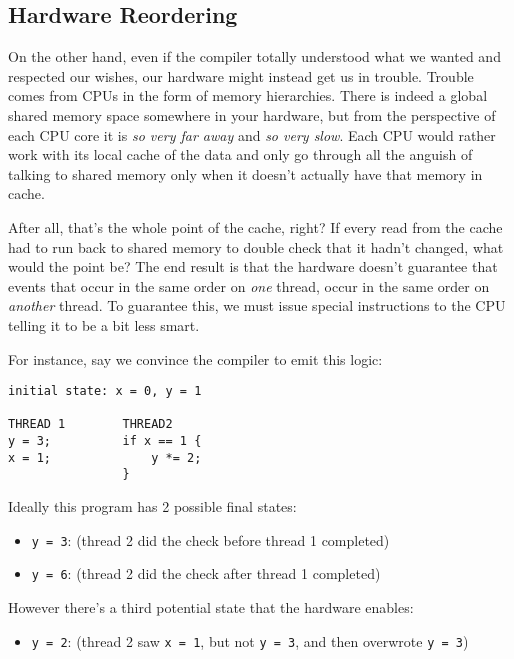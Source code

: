 \documentclass[a4paper,]{book}
\providecommand{\tightlist}{%
  \setlength{\itemsep}{0pt}\setlength{\parskip}{0pt}}
\begin{document}
\subsection{Hardware Reordering}\label{hardware-reordering}

On the other hand, even if the compiler totally understood what we
wanted and respected our wishes, our hardware might instead get us in
trouble. Trouble comes from CPUs in the form of memory hierarchies.
There is indeed a global shared memory space somewhere in your hardware,
but from the perspective of each CPU core it is \emph{so very far away}
and \emph{so very slow}. Each CPU would rather work with its local cache
of the data and only go through all the anguish of talking to shared
memory only when it doesn't actually have that memory in cache.

After all, that's the whole point of the cache, right? If every read
from the cache had to run back to shared memory to double check that it
hadn't changed, what would the point be? The end result is that the
hardware doesn't guarantee that events that occur in the same order on
\emph{one} thread, occur in the same order on \emph{another} thread. To
guarantee this, we must issue special instructions to the CPU telling it
to be a bit less smart.

For instance, say we convince the compiler to emit this logic:

\begin{verbatim}
initial state: x = 0, y = 1

THREAD 1        THREAD2
y = 3;          if x == 1 {
x = 1;              y *= 2;
                }
\end{verbatim}

Ideally this program has 2 possible final states:

\begin{itemize}
\tightlist
\item
  \texttt{y\ =\ 3}: (thread 2 did the check before thread 1 completed)
\item
  \texttt{y\ =\ 6}: (thread 2 did the check after thread 1 completed)
\end{itemize}

However there's a third potential state that the hardware enables:

\begin{itemize}
\tightlist
\item
  \texttt{y\ =\ 2}: (thread 2 saw \texttt{x\ =\ 1}, but not
  \texttt{y\ =\ 3}, and then overwrote \texttt{y\ =\ 3})
\end{itemize}
\end{document}
